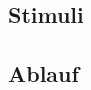 \documentclass[doc,a4paper,12pt]{apa6}
\begin{document}
\subsection{Stimuli}

\subsection{Ablauf}







\end{document}
